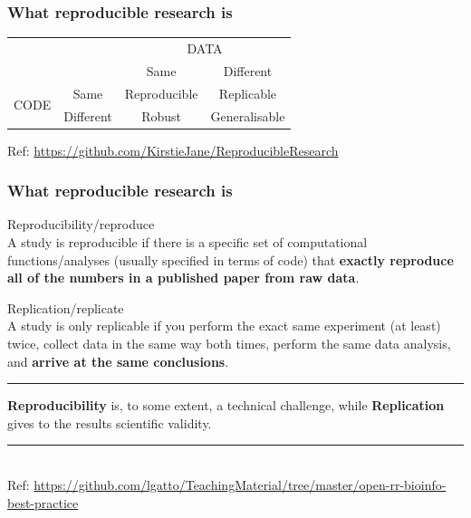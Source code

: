 \documentclass{beamer}
\begin{document}
\begin{frame}
\frametitle{What reproducible research is}
\begin{table}[]
\centering
\begin{tabular}{cccc}
                                           &                                & \multicolumn{2}{c}{DATA}                          \\ \cline{3-4}
                                           & \multicolumn{1}{c|}{}          & Same         & \multicolumn{1}{c|}{Different}     \\ \cline{2-4}
\multicolumn{1}{c|}{\multirow{2}{*}{CODE}} & \multicolumn{1}{c|}{Same}      & Reproducible & \multicolumn{1}{c|}{Replicable}    \\
\multicolumn{1}{c|}{}                      & \multicolumn{1}{c|}{Different} & Robust       & \multicolumn{1}{c|}{Generalisable} \\ \cline{2-4}
\end{tabular}
\end{table}
\vspace{3px}
\tiny Ref: {\url{https://github.com/KirstieJane/ReproducibleResearch}}
\end{frame}


\begin{frame}
\frametitle{What reproducible research is}

\Large{Reproducibility/reproduce}\\ \footnotesize A study is reproducible if there is a specific set of computational functions/analyses (usually specified in terms of code) that \textbf{exactly reproduce all of the numbers in a published paper from raw data}.

\Large{Replication/replicate}\\ \footnotesize A study is only replicable if you perform the exact same experiment (at least) twice, collect data in the same way both times, perform the same data analysis, and \textbf{arrive at the same conclusions}.
\rule{\textwidth}{0.05pt}
{\bf Reproducibility} is, to some extent, a technical challenge, while {\bf Replication} gives to the results scientific validity.
\rule{\textwidth}{0.05pt}\\
\vspace{3px}
\tiny Ref: {\url{https://github.com/lgatto/TeachingMaterial/tree/master/open-rr-bioinfo-best-practice}}
\end{frame}
\end{document}
